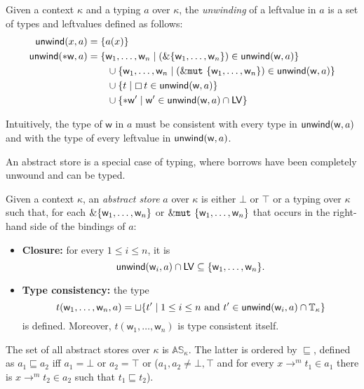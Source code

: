 \begin{definition}\label{def:unwind}
  Given a context $\kappa$ and a typing $a$ over $\kappa$, the \emph{unwinding} of a leftvalue
  in $a$ is a set of types and leftvalues defined as follows:
  \begin{align*}
  \mathsf{unwind}(x,a)&=\{a(x)\}\\
  \mathsf{unwind}(\mathtt{*}\mathsf{w},a)&=
  \{\mathsf{w}_1,\ldots,\mathsf{w}_n\mid(\&\{\mathsf{w}_1,\ldots,\mathsf{w}_n\})\in\mathsf{unwind}(\mathsf{w},a)\}\\
  &\qquad\cup\{\mathsf{w}_1,\ldots,\mathsf{w}_n\mid(\&\mathtt{mut}\ \{\mathsf{w}_1,\ldots,\mathsf{w}_n\})\in\mathsf{unwind}(\mathsf{w},a)\}\\
  &\qquad\cup\{t\mid\boxempty\,{t}\in\mathsf{unwind}(\mathsf{w},a)\}\\
  &\qquad\cup\{\mathtt{*}\mathsf{w}'\mid\mathsf{w}'\in\mathsf{unwind}(\mathsf{w},a)\cap\mathsf{LV}\}
  \end{align*}
\end{definition}

\noindent
Intuitively, the type of $\mathsf{w}$ in $a$ must be consistent with every type
in $\mathsf{unwind}(\mathsf{w},a)$ and with the type of every leftvalue in $\mathsf{unwind}(\mathsf{w},a)$.

An abstract store is a special case of typing, where borrows have been completely unwound
and can be typed.

\begin{definition}\label{def:abstract-store}
  Given a context $\kappa$, an \emph{abstract store} $a$ over $\kappa$ is either $\bot$ or $\top$
  or a typing over $\kappa$ such that, for each $\&\{\mathsf{w}_1,\ldots,\mathsf{w}_n\}$
    or $\&\mathtt{mut}\ \{\mathsf{w}_1,\ldots,\mathsf{w}_n\}$ that occurs in the right-hand side
    of the bindings of $a$:
  \begin{itemize}
  \item \textbf{Closure:} for every $1\le i\le n$, it is
    \[
    \mathsf{unwind}(\mathsf{w}_i,a)\cap\mathsf{LV}\subseteq\{\mathsf{w}_1,\ldots,\mathsf{w}_n\}.
    \]
  \item \textbf{Type consistency:} the type
    \[
    t(\mathsf{w}_1,\ldots,\mathsf{w}_n,a)=\sqcup\{t'\mid 1\le i\le n\text{ and }t'\in\mathsf{unwind}(\mathsf{w}_i,a)\cap\mathbb{T}_\kappa\}
    \]
    is defined. Moreover, $t(\mathsf{w}_1,\ldots,\mathsf{w}_n)$ is type consistent itself.
  \end{itemize}
  The set of all abstract stores over $\kappa$ is $\mathbb{AS}_\kappa$.
  The latter is ordered by $\sqsubseteq$, defined as $a_1\sqsubseteq a_2$ iff
  $a_1=\bot$ or $a_2=\top$ or
  ($a_1,a_2\not=\bot,\top$ and for every $x\to^mt_1\in a_1$ there is $x\to^mt_2\in a_2$
  such that $t_1\sqsubseteq t_2$).
\end{definition}

